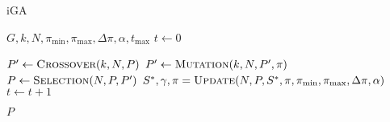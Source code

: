 \begin{algorithm}[t]
  \caption{iGA}\label{alg:GENETIKUS_ALGORITMUS}
  \begin{algorithmic}[1]
    \Require $G, k, N, \pi_{\min}, \pi_{\max}, \Delta \pi, \alpha, t_{\max}$
    \State $t \leftarrow 0$
    \State {}

    \State $P' \leftarrow \Call{Crossover}{k, N, P}$
    \State $P' \leftarrow \Call{Mutation}{k, N, P', \pi}$
    \State $P \leftarrow \Call{Selection}{N, P, P'}$
    \State $S^{*}, \gamma, \pi = \Call{Update}{N, P, S^{*}, \pi, \pi_{\min}, \pi_{\max}, \Delta \pi, \alpha}$
    \State $t \leftarrow t + 1$
    \EndWhile

    \State \Return $P$
  \end{algorithmic}
\end{algorithm}
